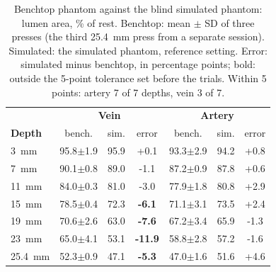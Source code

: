 \begin{table}[!tbp]
\centering
\caption{Benchtop phantom against the blind simulated phantom: lumen area, \% of rest. Benchtop: mean $\pm$ SD of three
presses (the third 25.4~mm press from a separate session). Simulated: the simulated phantom, reference setting. Error:
simulated minus benchtop, in percentage points; bold: outside the 5-point tolerance set before the trials. Within 5 points: artery
7 of 7 depths, vein 3 of 7.}
\label{tab:cast_validation}
\footnotesize
\setlength{\tabcolsep}{2.5pt}
\begin{tabular*}{\columnwidth}{@{\extracolsep{\fill}}lcccccc@{}}
\hline
 & \multicolumn{3}{c}{\textbf{Vein}} & \multicolumn{3}{c}{\textbf{Artery}} \\
\textbf{Depth} & bench. & sim. & error & bench. & sim. & error \\
\hline
3~mm & 95.8$\pm$1.9 & 95.9 & +0.1 & 93.3$\pm$2.9 & 94.2 & +0.8 \\
7~mm & 90.1$\pm$0.8 & 89.0 & -1.1 & 87.2$\pm$0.9 & 87.8 & +0.6 \\
11~mm & 84.0$\pm$0.3 & 81.0 & -3.0 & 77.9$\pm$1.8 & 80.8 & +2.9 \\
15~mm & 78.5$\pm$0.4 & 72.3 & \textbf{-6.1} & 71.1$\pm$3.1 & 73.5 & +2.4 \\
19~mm & 70.6$\pm$2.6 & 63.0 & \textbf{-7.6} & 67.2$\pm$3.4 & 65.9 & -1.3 \\
23~mm & 65.0$\pm$4.1 & 53.1 & \textbf{-11.9} & 58.8$\pm$2.8 & 57.2 & -1.6 \\
25.4~mm & 52.3$\pm$0.9 & 47.1 & \textbf{-5.3} & 47.0$\pm$1.6 & 51.6 & +4.6 \\
\hline
\end{tabular*}
\end{table}
